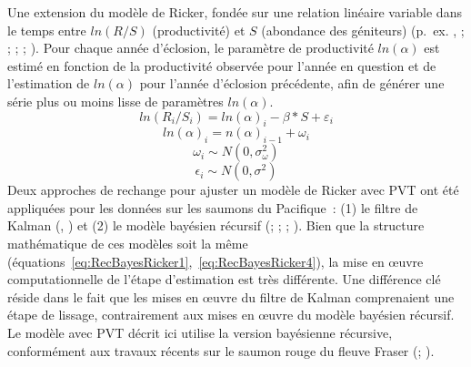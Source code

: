 \documentclass[french,11pt]{book}
\begin{document}
Une extension du modèle de Ricker, fondée sur une relation linéaire variable dans le temps entre \(ln(R/S)\) (productivité) et \(S\) (abondance des géniteurs) (p.~ex. , ; ; ; ; ). Pour chaque année d'éclosion, le paramètre de productivité \(ln(\alpha)\) est estimé en fonction de la productivité observée pour l'année en question et de l'estimation de \(ln(\alpha)\) pour l'année d'éclosion précédente, afin de générer une série plus ou moins lisse de paramètres \(ln(\alpha)\).
\begin{equation} 
  ln(R_{i}/S_{i}) = ln(\alpha)_i - \beta * S + \varepsilon_{i}
  \label{eq:RecBayesRicker1}
\end{equation}
\begin{equation} 
  ln(\alpha)_{i} = n(\alpha)_{i-1} + \omega_{i}
  \label{eq:RecBayesRicker2}
\end{equation}
\begin{equation} 
  \omega_i \sim N(0,\sigma_{\omega}^2)
  \label{eq:RecBayesRicker3}
\end{equation}
\begin{equation} 
  \epsilon_i \sim N(0,\sigma^2)
  \label{eq:RecBayesRicker4}
\end{equation}
Deux approches de rechange pour ajuster un modèle de Ricker avec PVT ont été appliquées pour les données sur les saumons du Pacifique~: (1) le filtre de Kalman (, ) et (2) le modèle bayésien récursif (; ; ; ). Bien que la structure mathématique de ces modèles soit la même (équations~\ref{eq:RecBayesRicker1},~\ref{eq:RecBayesRicker4}), la mise en œuvre computationnelle de l'étape d'estimation est très différente. Une différence clé réside dans le fait que les mises en œuvre du filtre de Kalman comprenaient une étape de lissage, contrairement aux mises en œuvre du modèle bayésien récursif. Le modèle avec PVT décrit ici utilise la version bayésienne récursive, conformément aux travaux récents sur le saumon rouge du fleuve Fraser (; ).
\end{document}
